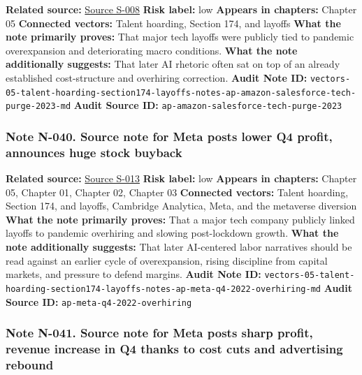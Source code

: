 \documentclass[
  american,
  11pt,
  letterpaper,
]{article}
\begin{document}
\textbf{Related source:}
\hyperref[source-s-008-amazon-salesforce-jettison-jobs-in-latest-tech-worker-purge]{Source
S-008} \textbf{Risk label:} low \textbf{Appears in chapters:} Chapter 05
\textbf{Connected vectors:} Talent hoarding, Section 174, and layoffs
\textbf{What the note primarily proves:} That major tech layoffs were
publicly tied to pandemic overexpansion and deteriorating macro
conditions. \textbf{What the note additionally suggests:} That later AI
rhetoric often sat on top of an already established cost-structure and
overhiring correction. \textbf{Audit Note ID:}
\texttt{vectors-05-talent-hoarding-section174-layoffs-notes-ap-amazon-salesforce-tech-purge-2023-md}
\textbf{Audit Source ID:} \texttt{ap-amazon-salesforce-tech-purge-2023}

\subsubsection{Note N-040. Source note for Meta posts lower Q4 profit,
announces huge stock
buyback}\label{note-n-040-vectors-05-talent-hoarding-section174-layoffs-notes-ap-meta-q4-2022-overhiring-md}

\textbf{Related source:}
\hyperref[source-s-013-meta-posts-lower-q4-profit-announces-huge-stock-buyback]{Source
S-013} \textbf{Risk label:} low \textbf{Appears in chapters:} Chapter
05, Chapter 01, Chapter 02, Chapter 03 \textbf{Connected vectors:}
Talent hoarding, Section 174, and layoffs, Cambridge Analytica, Meta,
and the metaverse diversion \textbf{What the note primarily proves:}
That a major tech company publicly linked layoffs to pandemic overhiring
and slowing post-lockdown growth. \textbf{What the note additionally
suggests:} That later AI-centered labor narratives should be read
against an earlier cycle of overexpansion, rising discipline from
capital markets, and pressure to defend margins. \textbf{Audit Note ID:}
\texttt{vectors-05-talent-hoarding-section174-layoffs-notes-ap-meta-q4-2022-overhiring-md}
\textbf{Audit Source ID:} \texttt{ap-meta-q4-2022-overhiring}

\subsubsection{Note N-041. Source note for Meta posts sharp profit,
revenue increase in Q4 thanks to cost cuts and advertising
rebound}\label{note-n-041-vectors-05-talent-hoarding-section174-layoffs-notes-ap-meta-q4-2023-year-of-efficiency-md}
\end{document}
